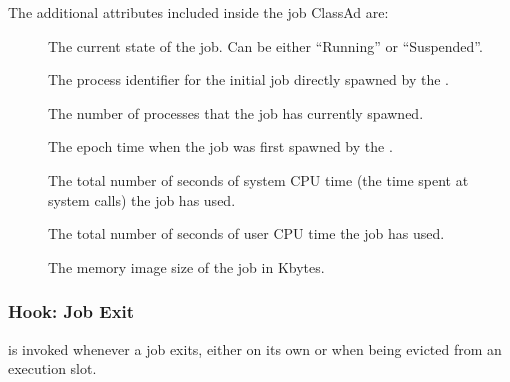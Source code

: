 The additional attributes included inside the job ClassAd are:
\begin{description}
\item[]
  The current state of the job.
  Can be either ``Running'' or ``Suspended''.

\item[]
  The process identifier for the initial job directly spawned by the
  .

\item[]
  The number of processes that the job has currently spawned.

\item[]
  The epoch time when the job was first spawned by the .

\item[]
  The total number of seconds of system CPU time (the time spent at
  system calls) the job has used.

\item[]
  The total number of seconds of user CPU time the job has used.

\item[]
  The memory image size of the job in Kbytes.
\end{description}


\subsubsection{\label{sec:job-hooks-job-exit}
Hook: Job Exit}

 is invoked whenever a job exits, either on its
own or when being evicted from an execution slot.


